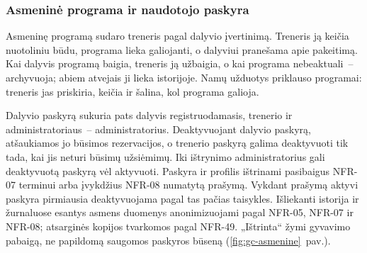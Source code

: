 \subsubsection{Asmeninė programa ir naudotojo paskyra}\label{sec:gc-asmenine}

Asmeninę programą sudaro treneris pagal dalyvio įvertinimą. Treneris ją
keičia nuotoliniu būdu, programa lieka galiojanti, o dalyviui pranešama apie
pakeitimą. Kai dalyvis programą baigia, treneris ją užbaigia, o kai programa
nebeaktuali~– archyvuoja; abiem atvejais ji lieka istorijoje. Namų užduotys
priklauso programai: treneris jas priskiria, keičia ir šalina, kol programa
galioja.

Dalyvio paskyrą sukuria pats dalyvis registruodamasis, trenerio ir
administratoriaus~– administratorius. Deaktyvuojant dalyvio paskyrą,
atšaukiamos jo būsimos rezervacijos, o trenerio paskyrą galima deaktyvuoti tik
tada, kai jis neturi būsimų užsiėmimų. Iki ištrynimo administratorius gali
deaktyvuotą paskyrą vėl aktyvuoti. Paskyra ir profilis ištrinami pasibaigus
NFR-07 terminui arba įvykdžius NFR-08 numatytą prašymą. Vykdant prašymą
aktyvi paskyra pirmiausia deaktyvuojama pagal tas pačias taisykles. Išliekanti
istorija ir žurnaluose esantys asmens duomenys anonimizuojami pagal NFR-05,
NFR-07 ir NFR-08; atsarginės kopijos tvarkomos pagal NFR-49.
„Ištrinta“ žymi gyvavimo pabaigą, ne papildomą saugomos paskyros būseną
(\ref{fig:gc-asmenine}~pav.).

